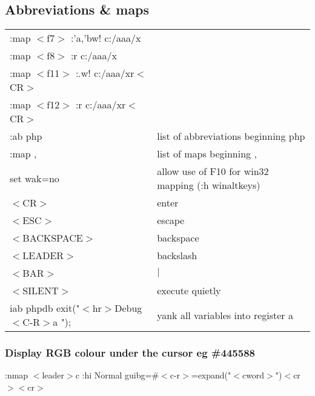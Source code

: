 \subsection{Abbreviations \& maps}
\begin{center}
\begin{longtable}{l|l}
:map $<$f7$>$   :'a,'bw! c:/aaa/x\\
:map $<$f8$>$   :r c:/aaa/x\\
:map $<$f11$>$  :.w! c:/aaa/xr$<$CR$>$\\
:map $<$f12$>$  :r c:/aaa/xr$<$CR$>$\\
:ab php & list of abbreviations beginning php\\
:map , & list of maps beginning ,\\
set wak=no & allow use of F10 for win32 mapping (:h winaltkeys)\\
$<$CR$>$             & enter\\
$<$ESC$>$            & escape\\
$<$BACKSPACE$>$      & backspace\\
$<$LEADER$>$         & backslash\\
$<$BAR$>$            & $|$\\
$<$SILENT$>$         & execute quietly\\
iab phpdb exit("$<$hr$>$Debug $<$C-R$>$a  "); & yank all variables into register a
\end{longtable}
\end{center}

\subsubsection{Display RGB colour under the cursor eg \#445588}
:nmap $<$leader$>$c :hi Normal guibg=\#$<$c-r$>$=expand("$<$cword$>$")$<$cr$>$$<$cr$>$

